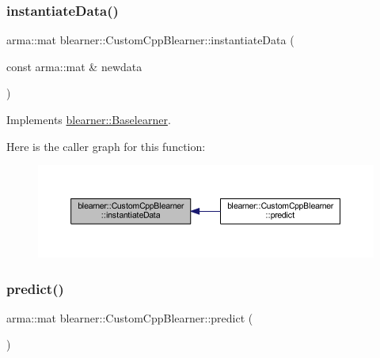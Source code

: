 \subsubsection{\texorpdfstring{instantiate\+Data()}{instantiateData()}}
{\footnotesize\ttfamily arma\+::mat blearner\+::\+Custom\+Cpp\+Blearner\+::instantiate\+Data (\begin{DoxyParamCaption}\item[{const arma\+::mat \&}]{newdata }\end{DoxyParamCaption})\hspace{0.3cm}{\ttfamily [virtual]}}



Implements \mbox{\hyperlink{classblearner_1_1_baselearner_af01f1b8c4540927705ff79c3649489f7}{blearner\+::\+Baselearner}}.

Here is the caller graph for this function\+:
\nopagebreak
\begin{figure}[H]
\begin{center}
\leavevmode
\includegraphics[width=350pt]{classblearner_1_1_custom_cpp_blearner_a14607a1d1f312d46a3024b37085c146d_icgraph}
\end{center}
\end{figure}
\mbox{\label{classblearner_1_1_custom_cpp_blearner_aa17db5f5627b8251b2d8484d92e783b9}} 
\subsubsection{\texorpdfstring{predict()}{predict()}\hspace{0.1cm}{\footnotesize\ttfamily [1/2]}}
{\footnotesize\ttfamily arma\+::mat blearner\+::\+Custom\+Cpp\+Blearner\+::predict (\begin{DoxyParamCaption}{ }\end{DoxyParamCaption})\hspace{0.3cm}{\ttfamily [virtual]}}



